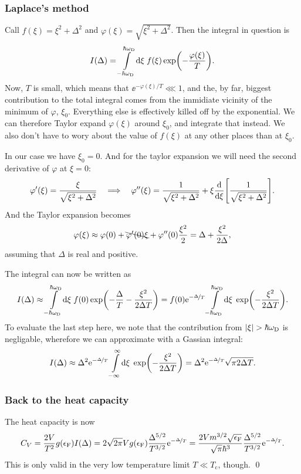 \documentclass[11pt,letter, swedish, english
]{article}
\newcommand{\Tc}{\ensuremath{T_{\text{c}}}}
\newcommand{\eF}{\ensuremath{\epsilon_{\text{F}}}}
\newcommand{\wD}{\ensuremath{\omega_{\text{D}}}}
\begin{document}
\subsubsection*{Laplace's method}
Call $f(\xi)=\xi^2+\Delta^2$ and
$\varphi(\xi)=\sqrt{\xi^2+\Delta^2}$. Then the integral in question is
\begin{equation}
I(\Delta)=\int_{-\hbar\wD}^{\hbar\wD}\!\rd\xi\;f(\xi)\exp(-\frac{\varphi(\xi)}{T}).
\end{equation}
Now, $T$ is small, which means that $\ee^{-\varphi(\xi)/T}\lll1$, and
the, by far, biggest contribution to the total integral comes from the
immidiate vicinity of the minimum of $\varphi$, $\xi_0$. Everything else is
effectively killed off by the exponential. 
We can therefore Taylor expand $\varphi(\xi)$ around $\xi_0$, and
integrate that instead. 
We also don't have to wory about the value of $f(\xi)$ at any other
places than at $\xi_0$.

In our case we have $\xi_0=0$. And for the taylor expansion we will
need the second derivative of $\varphi$ at $\xi=0$:
\begin{equation}
\varphi'(\xi)=\frac{\xi}{\sqrt{\xi^2+\Delta^2}}
\quad\Longrightarrow\quad
\varphi''(\xi)=\frac{1}{\sqrt{\xi^2+\Delta^2}}
+\xi\dv{\xi}\qty[\frac{1}{\sqrt{\xi^2+\Delta^2}}].
\end{equation}
And the Taylor expansion becomes
\begin{equation}
\varphi(\xi)\approx \varphi(0)+\bcancel{\varphi'(0)\xi}
+\varphi''(0)\frac{\xi^2}{2}
=\Delta+\frac{\xi^2}{2\Delta},
\end{equation}
assuming that $\Delta$ is real and positive.

The integral can now be written as
\begin{equation}
I(\Delta)\approx\int_{-\hbar\wD}^{\hbar\wD}\!\rd\xi\;f(0)
\exp(-\frac{\Delta}{T} - \frac{\xi^2}{2\Delta T})
=f(0)\ee^{-\nicefrac{\Delta}{T}}\int_{-\hbar\wD}^{\hbar\wD}\!\rd\xi\;
\exp(-\frac{\xi^2}{2\Delta T}).
\end{equation}
To evaluate the last step here, we note that the contribution from
$\abs{\xi}>\hbar\wD$ is negligable, wherefore we can approximate with a
Gassian integral:
\begin{equation}
I(\Delta)\approx \Delta^2\ee^{-\nicefrac{\Delta}{T}}
\int_{-\infty}^{\infty}\!\rd\xi\;
\exp(-\frac{\xi^2}{2\Delta T})
=\Delta^2\ee^{-\nicefrac{\Delta}{T}}
\sqrt{\pi2\Delta T}.
\end{equation}

\subsubsection*{Back to the heat capacity}
The heat capacity is now 
\begin{equation}\label{eq:1b_Cv}
C_V=\frac{2V}{T^2}g(\eF)I(\Delta)
=2\sqrt{2\pi}Vg(\eF)\frac{\Delta^{5/2}}{T^{3/2}}\ee^{-\nicefrac{\Delta}{T}}
=\frac{2Vm^{3/2}\sqrt{\eF}}{\sqrt{\pi}\hbar^3}
\frac{\Delta^{5/2}}{T^{3/2}}\ee^{-\nicefrac{\Delta}{T}}.
\end{equation}
This is only valid in the very low temperature limit $T\ll\Tc$,
though. 
\qed
\end{document}
